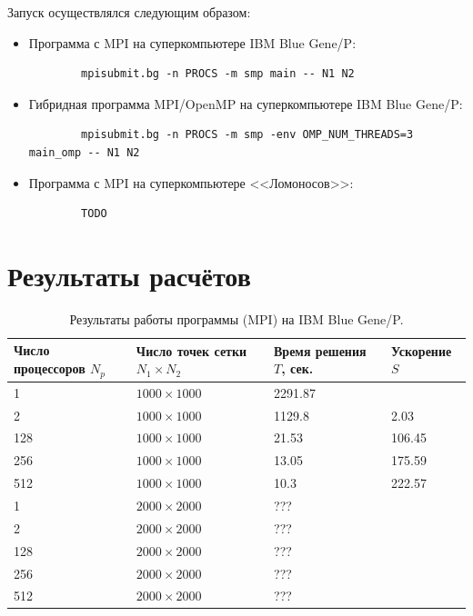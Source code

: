\documentclass[11pt]{article}
\numberwithin{equation}{section}
\theoremstyle{plain}
\theoremstyle{definition}
\begin{document}
Запуск осуществлялся следующим образом:
\begin{itemize}
    \item Программа с MPI на суперкомпьютере IBM Blue Gene/P:
        \begin{verbatim}
        mpisubmit.bg -n PROCS -m smp main -- N1 N2
        \end{verbatim}
    \item Гибридная программа MPI/OpenMP на суперкомпьютере IBM Blue Gene/P:
        \begin{verbatim}
        mpisubmit.bg -n PROCS -m smp -env OMP_NUM_THREADS=3 main_omp -- N1 N2
        \end{verbatim}
    \item Программа с MPI на суперкомпьютере <<Ломоносов>>:
        \begin{verbatim}
        TODO
        \end{verbatim}
\end{itemize}

\newpage
\section{Результаты расчётов}
\begin{table}[h]
\centering
\begin{tabular}{|l|l|l|l|}\hline
Число процессоров $N_p$ & Число точек сетки $N_1 \times N_2$ & Время решения $T$, сек. & Ускорение $S$ \\ \hline
1                       & $1000 \times 1000$                 & 2291.87                 &               \\
2                       & $1000 \times 1000$                 & 1129.8                  & 2.03          \\
128                     & $1000 \times 1000$                 & 21.53                   & 106.45        \\
256                     & $1000 \times 1000$                 & 13.05                   & 175.59        \\
512                     & $1000 \times 1000$                 & 10.3                    & 222.57        \\ \hline
1                       & $2000 \times 2000$                 & ???                     &               \\
2                       & $2000 \times 2000$                 & ???                     &               \\
128                     & $2000 \times 2000$                 & ???                     &               \\
256                     & $2000 \times 2000$                 & ???                     &               \\
512                     & $2000 \times 2000$                 & ???                     &               \\ \hline
\end{tabular}
    \caption{Результаты работы программы (MPI) на IBM Blue Gene/P.}
\label{tab_mpi}
\end{table}
\end{document}
